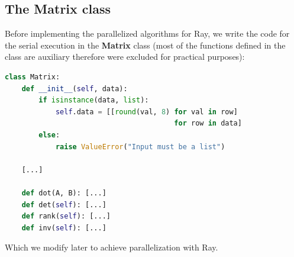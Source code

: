 \subsection{The Matrix class}
Before implementing the parallelized algorithms for Ray, we write the code for the serial execution in the \textbf{Matrix} class (most of the functions defined in the class are auxiliary therefore were excluded for practical purposes):

\begin{lstlisting}[language=Python, label=Matrix class]
class Matrix:
    def __init__(self, data):
        if isinstance(data, list):
            self.data = [[round(val, 8) for val in row]
                                        for row in data]
        else:
            raise ValueError("Input must be a list")
    
    [...]

    def dot(A, B): [...]
    def det(self): [...]
    def rank(self): [...]
    def inv(self): [...]
\end{lstlisting}
Which we modify later to achieve parallelization with Ray.

\pagebreak
